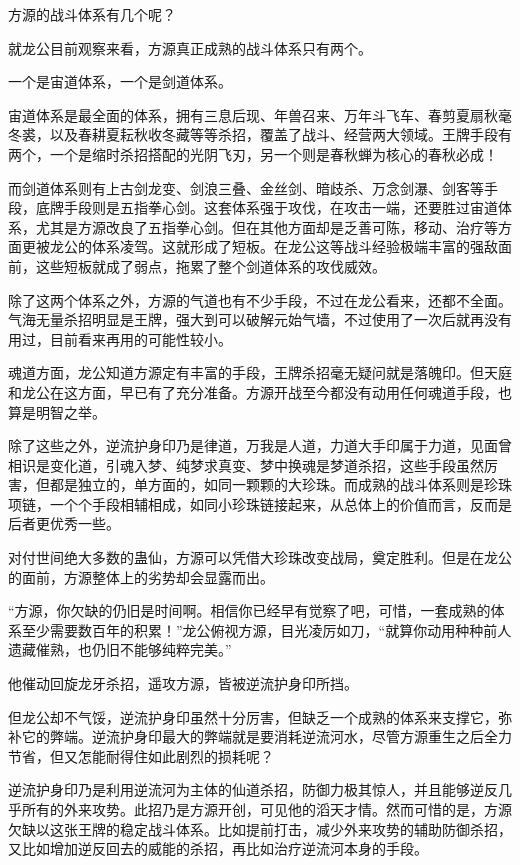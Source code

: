 
\begin{this_body}



方源的战斗体系有几个呢？

就龙公目前观察来看，方源真正成熟的战斗体系只有两个。

一个是宙道体系，一个是剑道体系。

宙道体系是最全面的体系，拥有三息后现、年兽召来、万年斗飞车、春剪夏扇秋毫冬裘，以及春耕夏耘秋收冬藏等等杀招，覆盖了战斗、经营两大领域。王牌手段有两个，一个是缩时杀招搭配的光阴飞刃，另一个则是春秋蝉为核心的春秋必成！

而剑道体系则有上古剑龙变、剑浪三叠、金丝剑、暗歧杀、万念剑瀑、剑客等手段，底牌手段则是五指拳心剑。这套体系强于攻伐，在攻击一端，还要胜过宙道体系，尤其是方源改良了五指拳心剑。但在其他方面却是乏善可陈，移动、治疗等方面更被龙公的体系凌驾。这就形成了短板。在龙公这等战斗经验极端丰富的强敌面前，这些短板就成了弱点，拖累了整个剑道体系的攻伐威效。

除了这两个体系之外，方源的气道也有不少手段，不过在龙公看来，还都不全面。气海无量杀招明显是王牌，强大到可以破解元始气墙，不过使用了一次后就再没有用过，目前看来再用的可能性较小。

魂道方面，龙公知道方源定有丰富的手段，王牌杀招毫无疑问就是落魄印。但天庭和龙公在这方面，早已有了充分准备。方源开战至今都没有动用任何魂道手段，也算是明智之举。

除了这些之外，逆流护身印乃是律道，万我是人道，力道大手印属于力道，见面曾相识是变化道，引魂入梦、纯梦求真变、梦中换魂是梦道杀招，这些手段虽然厉害，但都是独立的，单方面的，如同一颗颗的大珍珠。而成熟的战斗体系则是珍珠项链，一个个手段相辅相成，如同小珍珠链接起来，从总体上的价值而言，反而是后者更优秀一些。

对付世间绝大多数的蛊仙，方源可以凭借大珍珠改变战局，奠定胜利。但是在龙公的面前，方源整体上的劣势却会显露而出。

“方源，你欠缺的仍旧是时间啊。相信你已经早有觉察了吧，可惜，一套成熟的体系至少需要数百年的积累！”龙公俯视方源，目光凌厉如刀，“就算你动用种种前人遗藏催熟，也仍旧不能够纯粹完美。”

他催动回旋龙牙杀招，遥攻方源，皆被逆流护身印所挡。

但龙公却不气馁，逆流护身印虽然十分厉害，但缺乏一个成熟的体系来支撑它，弥补它的弊端。逆流护身印最大的弊端就是要消耗逆流河水，尽管方源重生之后全力节省，但又怎能耐得住如此剧烈的损耗呢？

逆流护身印乃是利用逆流河为主体的仙道杀招，防御力极其惊人，并且能够逆反几乎所有的外来攻势。此招乃是方源开创，可见他的滔天才情。然而可惜的是，方源欠缺以这张王牌的稳定战斗体系。比如提前打击，减少外来攻势的辅助防御杀招，又比如增加逆反回去的威能的杀招，再比如治疗逆流河本身的手段。


\end{this_body}
